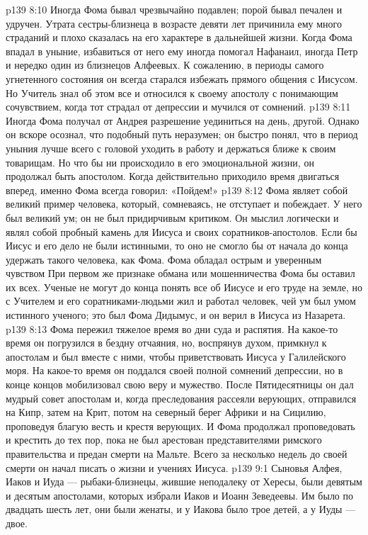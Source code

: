 \vs p139 8:10 \pc Иногда Фома бывал чрезвычайно подавлен; порой бывал печален и удручен. Утрата сестры\hyp{}близнеца в возрасте девяти лет причинила ему много страданий и плохо сказалась на его характере в дальнейшей жизни. Когда Фома впадал в уныние, избавиться от него ему иногда помогал Нафанаил, иногда Петр и нередко один из близнецов Алфеевых. К сожалению, в периоды самого угнетенного состояния он всегда старался избежать прямого общения с Иисусом. Но Учитель знал об этом все и относился к своему апостолу с понимающим сочувствием, когда тот страдал от депрессии и мучился от сомнений.
\vs p139 8:11 Иногда Фома получал от Андрея разрешение уединиться на день, другой. Однако он вскоре осознал, что подобный путь неразумен; он быстро понял, что в период уныния лучше всего с головой уходить в работу и держаться ближе к своим товарищам. Но что бы ни происходило в его эмоциональной жизни, он продолжал быть апостолом. Когда действительно приходило время двигаться вперед, именно Фома всегда говорил: «Пойдем!»
\vs p139 8:12 Фома являет собой великий пример человека, который, сомневаясь, не отступает и побеждает. У него был великий ум; он не был придирчивым критиком. Он мыслил логически и являл собой пробный камень для Иисуса и своих соратников\hyp{}апостолов. Если бы Иисус и его дело не были истинными, то оно не смогло бы от начала до конца удержать такого человека, как Фома. Фома обладал острым и уверенным чувством  При первом же признаке обмана или мошенничества Фома бы оставил их всех. Ученые не могут до конца понять все об Иисусе и его труде на земле, но с Учителем и его соратниками\hyp{}людьми жил и работал человек, чей ум был умом истинного ученого; это был Фома Дидымус, и он верил в Иисуса из Назарета.
\vs p139 8:13 \pc Фома пережил тяжелое время во дни суда и распятия. На какое\hyp{}то время он погрузился в бездну отчаяния, но, воспрянув духом, примкнул к апостолам и был вместе с ними, чтобы приветствовать Иисуса у Галилейского моря. На какое\hyp{}то время он поддался своей полной сомнений депрессии, но в конце концов мобилизовал свою веру и мужество. После Пятидесятницы он дал мудрый совет апостолам и, когда преследования рассеяли верующих, отправился на Кипр, затем на Крит, потом на северный берег Африки и на Сицилию, проповедуя благую весть и крестя верующих. И Фома продолжал проповедовать и крестить до тех пор, пока не был арестован представителями римского правительства и предан смерти на Мальте. Всего за несколько недель до своей смерти он начал писать о жизни и учениях Иисуса.
\vs p139 9:1 Сыновья Алфея, Иаков и Иуда --- рыбаки\hyp{}близнецы, жившие неподалеку от Хересы, были девятым и десятым апостолами, которых избрали Иаков и Иоанн Зеведеевы. Им было по двадцать шесть лет, они были женаты, и у Иакова было трое детей, а у Иуды --- двое.
